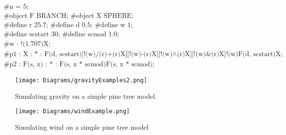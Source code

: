 \begin{singlespace}
\begin{equation}
\begin{aligned}
	&\textrm{\#n = 5;} \\
	&\textrm{\#object F BRANCH; \#object X SPHERE;}\\
	&\textrm{\#define r 25.7; \#define d 0.5; \#define w 1;}\\
	&\textrm{\#define scstart 30; \#define scmod 1.0;}\\
	&\textrm{\#w : !(1.707)X;}\\
	&\textrm{\#p1 : X : * : F(d, scstart)[!(w)/(r)+(r)X][!(w)-(r)X][!(w)$\land$(r)X][!(w)\&(r)X]!(w)F(d, scstart)X;}\\
	&\textrm{\#p2 : F(s, x) : * : F(s, x * scmod)F(s, x * scmod);}
\end{aligned}
\end{equation}
\end{singlespace}



\begin{figure}[htbp]
	{\centering
		\vspace{7px}
		\texttt{[image: Diagrams/gravityExamples2.png]}
		\label{3DAxisFigure} \label{Gravity applied to generated models 2}
		\caption{Simulating gravity on a simple pine tree model.}
	}
\end{figure}
\FloatBarrier

\begin{figure}[htbp]
	{\centering
		\vspace{7px}
		\texttt{[image: Diagrams/windExample.png]}
		\label{3DAxisFigure} \label{Gravity applied to generated models 2}
		\caption{Simulating wind on a simple pine tree model}
	}
\end{figure}
\FloatBarrier


